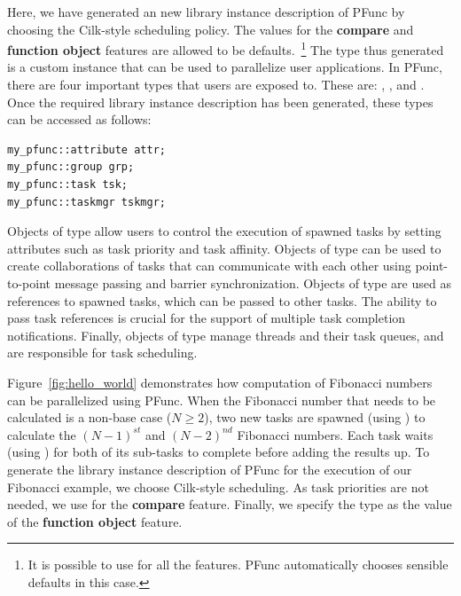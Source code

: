 \documentclass{sig-alternate}
\begin{document}
Here, we have generated an new library instance description of PFunc by
choosing the Cilk-style scheduling policy. The values for the \textbf{compare}
and \textbf{function object} features are allowed to be defaults.~\footnote{It
is possible to use  for all the features.
PFunc automatically chooses sensible defaults in this case.}
The type  thus generated is a custom instance that can be used
to parallelize user applications. In PFunc, there are four important types that
users are exposed to.  These are: ,
,  and .  Once the required library
instance description has been generated, these types can be accessed as
follows:

\begin{lstlisting}
my_pfunc::attribute attr; 
my_pfunc::group grp; 
my_pfunc::task tsk; 
my_pfunc::taskmgr tskmgr; 
\end{lstlisting}

Objects of type  allow users to control the execution of
spawned tasks by setting attributes such as task priority and task affinity. 
Objects of type  can be used to create collaborations of tasks that
can communicate with each other using point-to-point message passing and
barrier synchronization.
Objects of type  are used as references to spawned tasks, which 
can be passed to other tasks. The ability to pass task references is crucial
for the support of multiple task completion notifications.
Finally, objects of type  manage threads and their task
queues, and are responsible for task scheduling. 

Figure~\ref{fig:hello_world} demonstrates how computation of Fibonacci numbers
can be parallelized using PFunc. When the Fibonacci number that needs to be
calculated is a non-base case ($N\ge2$), two new tasks are spawned (using
) to calculate the $(N-1)^{st}$ and $(N-2)^{nd}$ Fibonacci numbers.
Each task waits (using ) for both of its sub-tasks to complete
before adding the results up. 
%
To generate the library instance description of PFunc for the execution of our
Fibonacci example, we choose Cilk-style scheduling.  As task priorities are not needed,
we use  for the \textbf{compare} feature.  Finally, we
specify the type  as the value of the \textbf{function object}
feature.
\end{document}
